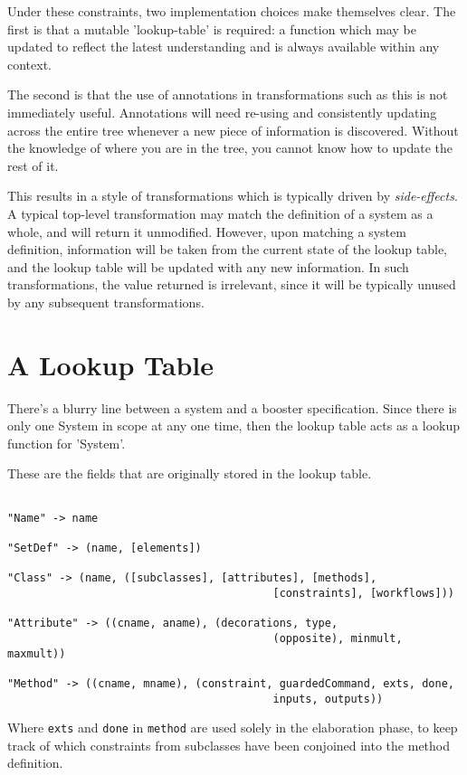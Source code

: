 Under these constraints, two implementation choices make themselves
clear.  The first is that a mutable 'lookup-table' is required: a
function which may be updated to reflect the latest understanding and
is always available within any context.

The second is that the use of annotations in transformations such as
this is not immediately useful.  Annotations will need re-using and
consistently updating across the entire tree whenever a new piece of
information is discovered.  Without the knowledge of where you are in
the tree, you cannot know how to update the rest of it.  

This results in a style of transformations which is typically driven
by \emph{side-effects}.  A typical top-level transformation may match
the definition of a system as a whole, and will return it unmodified.
However, upon matching a system definition, information will be taken
from the current state of the lookup table, and the lookup table will
be updated with any new information.  In such transformations, the
value returned is irrelevant, since it will be typically unused by any
subsequent transformations.




\section{A Lookup Table}

There's a blurry line between a system and a booster specification.
Since there is only one System in scope at any one time, then the
lookup table acts as a lookup function for 'System'.

These are the fields that are originally stored in the lookup table.

\begin{verbatim}

"Name" -> name

"SetDef" -> (name, [elements])

"Class" -> (name, ([subclasses], [attributes], [methods], 
                                         [constraints], [workflows]))

"Attribute" -> ((cname, aname), (decorations, type, 
                                         (opposite), minmult, maxmult)) 

"Method" -> ((cname, mname), (constraint, guardedCommand, exts, done, 
                                         inputs, outputs))

\end{verbatim}

Where \verb|exts| and \verb|done| in \verb|method| are used solely in the elaboration
phase, to keep track of which constraints from subclasses have been
conjoined into the method definition.
